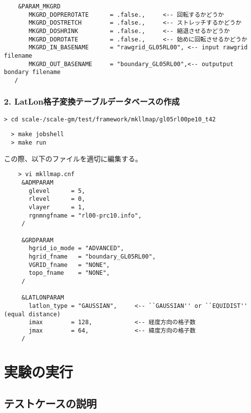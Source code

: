 \begin{enumerate}
\begin{verbatim}
    &PARAM_MKGRD
       MKGRD_DOPREROTATE      = .false.,     <-- 回転するかどうか
       MKGRD_DOSTRETCH        = .false.,     <-- ストレッチするかどうか
       MKGRD_DOSHRINK         = .false.,     <-- 縮退させるかどうか
       MKGRD_DOROTATE         = .false.,     <-- 始めに回転させるかどうか
       MKGRD_IN_BASENAME      = "rawgrid_GL05RL00", <-- input rawgrid filename
       MKGRD_OUT_BASENAME     = "boundary_GL05RL00",<-- outputput bondary filename
   /
\end{verbatim}
\end{enumerate}

\subsubsection{2. LatLon格子変換テーブルデータベースの作成}

\verb|> cd scale-|{\version}\verb|/scale-gm/test/framework/mkllmap/gl05rl00pe10_t42|
\vspace{-3mm}
\begin{verbatim}
  > make jobshell
  > make run
\end{verbatim}
 この際、以下のファイルを適切に編集する。
 \begin{verbatim}
    > vi mkllmap.cnf
     &ADMPARAM
       glevel      = 5,
       rlevel      = 0,
       vlayer      = 1,
       rgnmngfname = "rl00-prc10.info",
     /

     &GRDPARAM
       hgrid_io_mode = "ADVANCED",
       hgrid_fname   = "boundary_GL05RL00",
       VGRID_fname   = "NONE",
       topo_fname    = "NONE",
     /

     &LATLONPARAM
       latlon_type = "GAUSSIAN",     <-- ``GAUSSIAN'' or ``EQUIDIST'' (equal distance)
       imax        = 128,            <-- 経度方向の格子数
       jmax        = 64,             <-- 緯度方向の格子数
     /
 \end{verbatim}



\section{実験の実行}
\subsection{テストケースの説明}

